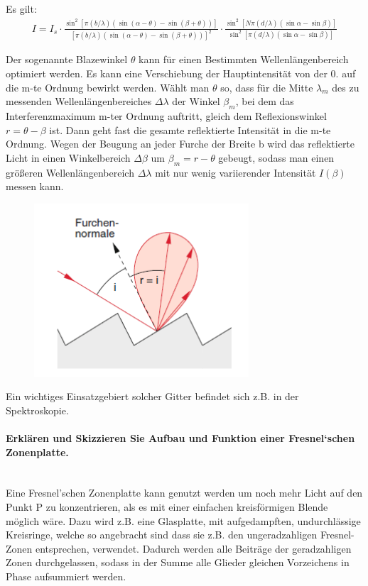 \documentclass[a4paper, 11pt, ngerman, parskip=half-]{scrartcl}
\newcommand{\myparagraph}[1]{\paragraph{#1}\mbox{}\\}
\begin{document}
    Es gilt:
    \begin{align*}
        I = I_s \cdot \frac{\sin^2[\pi (b/\lambda)(\sin(\alpha-\theta)-\sin(\beta + \theta))]}{[\pi (b/\lambda) (\sin(\alpha-\theta)-\sin(\beta + \theta))]^2} \cdot \frac{\sin^2 [N \pi (d/\lambda) (\sin\alpha - \sin\beta)]}{\sin^2[\pi (d/\lambda) (\sin \alpha - \sin \beta)]}
    \end{align*}

    Der sogenannte Blazewinkel $\theta$ kann für einen Bestimmten Wellenlängenbereich optimiert werden. Es kann eine Verschiebung der Hauptintensität von der 0. auf die m-te Ordnung bewirkt werden. Wählt man $\theta$ so, dass für die Mitte $\lambda_m$ des zu messenden Wellenlängenbereiches $\Delta \lambda$ der Winkel $\beta_m$, bei dem das Interferenzmaximum m-ter Ordnung auftritt, gleich dem Reflexionswinkel $r = \theta -\beta$ ist. Dann geht fast die gesamte reflektierte Intensität in die m-te Ordnung. Wegen der Beugung an jeder Furche der Breite b wird das reflektierte Licht in einen Winkelbereich $\Delta \beta$ um $\beta_m = r - \theta$ gebeugt, sodass man einen größeren Wellenlängenbereich $\Delta \lambda$ mit nur wenig variierender Intensität $I(\beta)$ messen kann.

    \begin{figure}[H]
        \centering
        \includegraphics[width=8cm]{image/19/4.2}
    \end{figure}

    Ein wichtiges Einsatzgebiert solcher Gitter befindet sich z.B. in der Spektroskopie.

    \myparagraph{Erklären und Skizzieren Sie Aufbau und Funktion einer Fresnel‘schen Zonenplatte.}

    Eine Fresnel'schen Zonenplatte kann genutzt werden um noch mehr Licht auf den Punkt P zu konzentrieren, als es mit einer einfachen kreisförmigen Blende möglich wäre. Dazu wird z.B. eine Glasplatte, mit aufgedampften, undurchlässige Kreisringe, welche so angebracht sind dass sie z.B. den ungeradzahligen Fresnel-Zonen entsprechen, verwendet. Dadurch werden alle Beiträge der geradzahligen Zonen durchgelassen, sodass in der Summe alle Glieder gleichen Vorzeichens in Phase aufsummiert werden.
\end{document}

